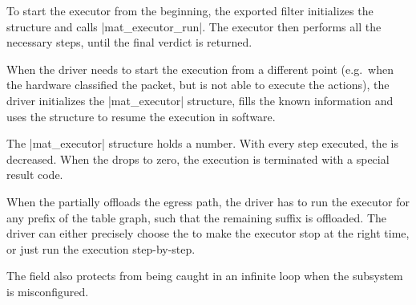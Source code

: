To start the executor from the beginning, the exported  filter
initializes the structure and calls \fnc|mat_executor_run|. The executor
then performs all the necessary steps, until the final verdict is returned.

When the driver needs to start the execution from a different point (e.g.\ when
the hardware classified the packet, but is not able to execute the actions),
the driver initializes the \struct|mat_executor| structure, fills the known
information and uses the structure to resume the execution in software.

The \struct|mat_executor| structure holds a  number. With every step
executed, the  is decreased. When the  drops to zero, the
execution is terminated with a special result code.

When the  partially offloads the egress path, the driver has to run the
executor for any prefix of the table graph, such that the remaining suffix is
offloaded. The driver can either precisely choose the  to make the executor
stop at the right time, or just run the execution step-by-step.

The  field also protects from being caught in an infinite loop when the
subsystem is misconfigured.
